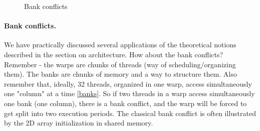 \begin{figure}[h!]
   \centering
   \qquad
   \caption{Bank conflicts}
   \label{fig:bankconflicts2}
\end{figure}

\paragraph{Bank conflicts.} We have practically discussed several applications of the theoretical notions described in the section 
on architecture. How about the bank conflicts? Remember - the warps are chunks of threads (way of scheduling/organizing them). 
The banks are chunks of memory and a way to structure them. Also remember that, ideally, 32 threads, 
organized in one warp, access simultaneously one "column" at a time \autoref{banks}. So if two threads in a warp access simultaneously 
one bank (one column), there is a bank conflict, and the warp will be forced to get split into two execution periods. 
The classical bank conflict is often illustrated by the 2D array initialization in shared memory. 


